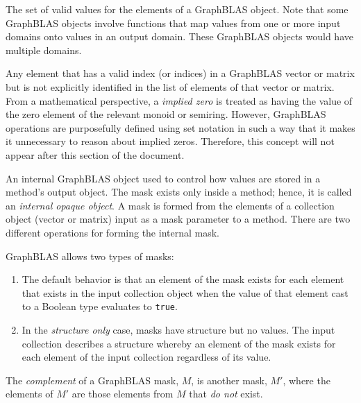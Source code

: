 The set of valid values for the elements of a GraphBLAS object.
Note that some GraphBLAS objects involve functions that map values from one or more input domains 
onto values in an output domain.  These GraphBLAS objects would have multiple domains.

  Any element that has a valid index (or indices) 
in a GraphBLAS vector or matrix but is not explicitly identified in the list of 
elements of that vector or matrix. From a mathematical perspective, a 
\emph{implied zero} is treated as having the 
value of the zero element of the relevant monoid or semiring.
However, GraphBLAS operations are purposefully defined using set notation in such a way
that it makes it unnecessary to reason about implied zeros. Therefore, this concept will
not appear after this section of the document. 

 An internal GraphBLAS object used to control how values 
are stored in a method's output object.  The mask exists only inside a method; hence,
it is called an \emph{internal opaque object}.  A mask is formed from the elements of
a collection object (vector or matrix) input as a mask parameter to a method. There
are two different operations for forming the internal mask.  

GraphBLAS allows two types of masks:
\begin{enumerate}
\item The default 
behavior is that an element of the mask exists for each element that exists in the 
input collection object when the value of that element cast to a Boolean type evaluates to 
{\tt true}.  
\item In the {\it structure only} case, masks have structure but no values. 
The input collection describes a structure whereby an 
element of the mask exists for each element of the input collection regardless of its value.
\end{enumerate}

 The \emph{complement} of a 
GraphBLAS mask, $M$, is another mask, $M'$, where the elements of $M'$
are those elements from $M$ that \emph{do not} exist.  

